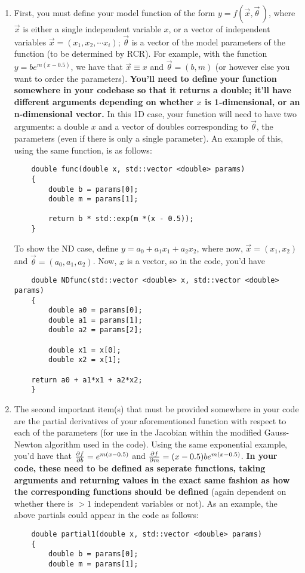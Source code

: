 \documentclass[12pt]{article}
\begin{document}
\begin{enumerate}
	\item First, you must define your model function of the form $y = f(\vec{x},\vec{\theta}\,)$, where $\vec{x}$ is either a single independent variable $x$, or a vector of independent variables $\vec{x} = (x_1, x_2, \cdots x_i)$; $\vec{\theta}$ is a vector of the model parameters of the function (to be determined by RCR). For example, with the function $y = be^{m(x-0.5)}$, we have that $\vec{x} \equiv x$ and $\vec{\theta} = (b, m)$ (or however else you want to order the parameters). \textbf{You'll need to define your function somewhere in your codebase so that it returns a double; it'll have different arguments depending on whether $x$ is 1-dimensional, or an n-dimensional vector.} In this 1D case, your function will need to have two arguments: a double $x$ and a vector of doubles corresponding to $\vec{\theta}$, the parameters (even if there is only a single parameter). An example of this, using the same function, is as follows:
	\begin{lstlisting}
	double func(double x, std::vector <double> params)
	{
		double b = params[0];
		double m = params[1];
	
		return b * std::exp(m *(x - 0.5));
	}
	\end{lstlisting}
	To show the ND case, define $y = a_0 + a_1x_1 + a_2x_2$, where now, $\vec{x} = (x_1, x_2)$ and $\vec{\theta} = (a_0, a_1, a_2)$. Now, $x$ is a vector, so in the code, you'd have
	\begin{lstlisting}
	double NDfunc(std::vector <double> x, std::vector <double> params)
	{
		double a0 = params[0];
		double a1 = params[1];
		double a2 = params[2];
		
		double x1 = x[0];
		double x2 = x[1];
		
	return a0 + a1*x1 + a2*x2;
	}
	\end{lstlisting}
	\item The second important item(s) that must be provided somewhere in your code are the partial derivatives of your aforementioned function with respect to each of the parameters (for use in the Jacobian within the modified Gauss-Newton algorithm used in the code). Using the same exponential example, you'd have that $\pdv{f}{b} = e^{m(x-0.5)}$ and $\pdv{f}{m} = (x-0.5)be^{m(x-0.5)}$. \textbf{In your code, these need to be defined as seperate functions, taking arguments and returning values in the exact same fashion as how the corresponding functions should be defined} (again dependent on whether there is $>1$ independent variables or not). As an example, the above partials could appear in the code as follows:
	\begin{lstlisting}
	double partial1(double x, std::vector <double> params)
	{
		double b = params[0];
		double m = params[1];
		

\end{lstlisting}
\end{enumerate}
\end{document}

